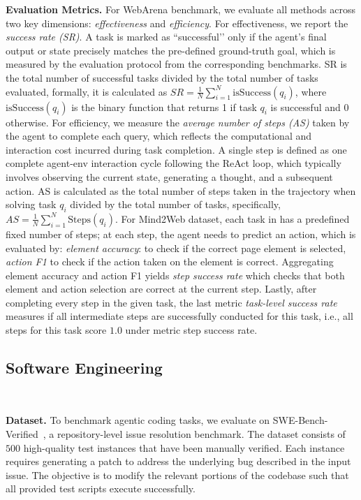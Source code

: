 \noindent\textbf{Evaluation Metrics.} For WebArena benchmark, we evaluate all methods across two key dimensions: \textit{effectiveness} and \textit{efficiency}. For effectiveness, we report the \textit{success rate (SR)}. A task is marked as ``successful’’ only if the agent’s final output or state precisely matches the pre-defined ground-truth goal, which is measured by the evaluation protocol from the corresponding benchmarks. SR is the total number of successful tasks divided by the total number of tasks evaluated, formally, it is calculated as $SR = \frac{1}{N}\sum_{i=1}^N \text{isSuccess}(q_i)$, where $\text{isSuccess}(q_i)$ is the binary function that returns 1 if task $q_i$ is successful and 0 otherwise.
For efficiency, we measure the \textit{average number of steps (AS)} taken by the agent to complete each query, which reflects the computational and interaction cost incurred during task completion. A single step is defined as one complete agent-env interaction cycle following the ReAct loop, which typically involves observing the current state, generating a thought, and a subsequent action. AS is calculated as the total number of steps taken in the trajectory when solving task $q_i$ divided by the total number of tasks, specifically, $AS = \frac{1}{N}\sum_{i=1}^N \text{Steps}(q_i)$.
For Mind2Web dataset, each task in has a predefined fixed number of steps; at each step, the agent needs to predict an action, which is evaluated by: \textit{element accuracy}: to check if the correct page element is selected, \textit{action F1} to check if the
action taken on the element is correct. Aggregating element accuracy and action F1 yields \textit{step success rate} which
checks that both element and action selection are correct at the current step. Lastly, after completing every step in the given task, the last metric \textit{task-level success rate} measures if all intermediate steps are successfully conducted for this task, i.e., all steps for this task score $1.0$ under metric step success rate.


\subsection{Software Engineering}~\label{app: swe-bench}


\noindent\textbf{Dataset.} To benchmark agentic coding tasks, we evaluate on SWE-Bench-Verified~\citep{jimenez2024swebench}, a repository-level issue resolution benchmark. The dataset consists of $500$ high-quality test instances that have been manually verified. Each instance requires generating a patch to address the underlying bug described in the input issue. The objective is to modify the relevant portions of the codebase such that all provided test scripts execute successfully.

